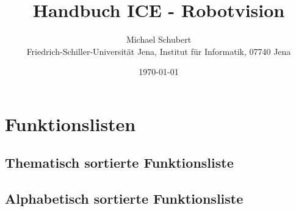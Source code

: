 \documentclass[10pt,titlepage]{article}
\begin{document}
\title{Handbuch ICE - Robotvision}
\author{Michael Schubert\\
Friedrich-Schiller-Universität Jena, Institut für Informatik, 07740 Jena}
\date{\today}
\maketitle


\newpage

\newpage

\newpage

\newpage

\newpage

\newpage

\newpage

\newpage

\newpage

\newpage
\section{Funktionslisten}
\subsection{Thematisch sortierte Funktionsliste}


\subsection{Alphabetisch sortierte Funktionsliste}

\end{document}
